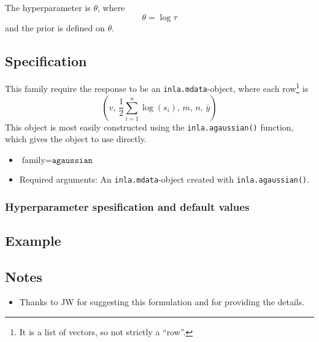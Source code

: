 \documentclass[a4paper,11pt]{article}
\begin{document}
The hyperparameter is $\theta$, where
\begin{displaymath}
    \theta = \log \tau
\end{displaymath}
and the prior is defined on $\theta$.

\subsection*{Specification}

This family require the response to be an \texttt{inla.mdata}-object,
where each row\footnote{It is a list of vectors, so not strictly a
    ``row''.} is
\begin{displaymath}
    (v, \,
    \frac{1}{2}\sum_{i=1}^{n} \log(s_i), \,
    m, \,
    n, \,
    \bar{y})
\end{displaymath}
This object is most easily constructed using the
\texttt{inla.agaussian()} function, which gives the object to use
directly.

\begin{itemize}
\item $\text{family}=\texttt{agaussian}$
\item Required arguments: An \texttt{inla.mdata}-object created with
    \texttt{inla.agaussian()}.
\end{itemize}

\subsubsection*{Hyperparameter spesification and default values}


\subsection*{Example}



\subsection*{Notes}

\begin{itemize}
\item Thanks to JW for suggesting this formulation and for providing
    the details.
\end{itemize}
\end{document}
